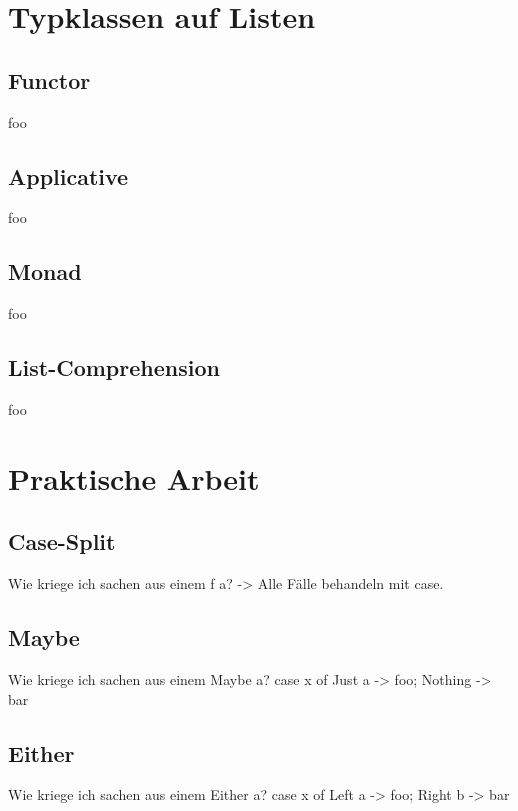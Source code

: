 \documentclass{beamer}
\begin{document}
\section{Typklassen auf Listen}
\subsection{Functor}
\begin{frame}
 foo
\end{frame}

\subsection{Applicative}
\begin{frame}
 foo
\end{frame}

\subsection{Monad}
\begin{frame}
 foo
\end{frame}

\subsection{List-Comprehension}
\begin{frame}
 foo
\end{frame}

\section{Praktische Arbeit}

\subsection{Case-Split}
\begin{frame}
 Wie kriege ich sachen aus einem f a? -> Alle Fälle behandeln mit case.
\end{frame}
\subsection{Maybe}
\begin{frame}
 Wie kriege ich sachen aus einem Maybe a? case x of Just a -> foo; Nothing -> bar
\end{frame}
\subsection{Either}
\begin{frame}
 Wie kriege ich sachen aus einem Either a? case x of Left a -> foo; Right b -> bar
\end{frame}
\end{document}
